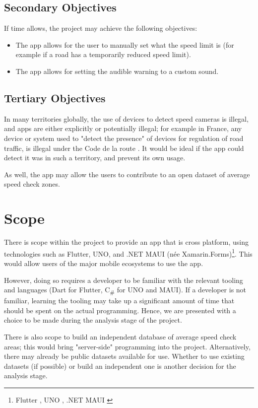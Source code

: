 \documentclass[11pt, a4paper, notitlepage]{report}
\begin{document}
\subsection{Secondary Objectives}
If time allows, the project may achieve the following objectives:
\begin{itemize}
    \item The app allows for the user to manually set what the speed limit is 
    (for example if a road has a temporarily reduced speed limit).
    \item The app allows for setting the audible warning to a custom sound.
\end{itemize}

\subsection{Tertiary Objectives}
In many territories globally, the use of devices to detect speed cameras is 
illegal, and apps are either explicitly or potentially illegal; for example in 
France, any device or system used to "detect the presence" of devices for 
regulation of road traffic, is illegal under the Code de la route 
\citep{CodeDeLaRoute}.
It would be ideal if the app could detect it was in such a territory, and 
prevent its own usage.

As well, the app may allow the users to contribute to an open dataset of 
average speed check zones.

\section{Scope}\label{sec:Scope}
There is scope within the project to provide an app that is cross platform, 
using technologies such as Flutter, UNO, and .NET MAUI (née 
Xamarin.Forms)\footnote{Flutter \citep{FlutterWebsite}, UNO \citep{UnoWebsite}, 
.NET MAUI \citep{UnoWebsite}}. This would allow users of the major mobile 
ecosystems to use the app. 

However, doing so requires a developer to be familiar with the relevant tooling 
and languages (Dart for Flutter, C\textsubscript{\#} for UNO and MAUI). If a 
developer is not familiar, learning the tooling may take up a significant 
amount of time that should be spent on the actual programming. Hence, we are 
presented with a choice to be made during the analysis stage of the project.

There is also scope to build an independent database of average speed check 
areas; this would bring "server-side" programming into the project. 
Alternatively, there may already be public datasets available for use. Whether 
to use existing datasets (if possible) or build an independent one is another 
decision for the analysis stage. 
\end{document}
